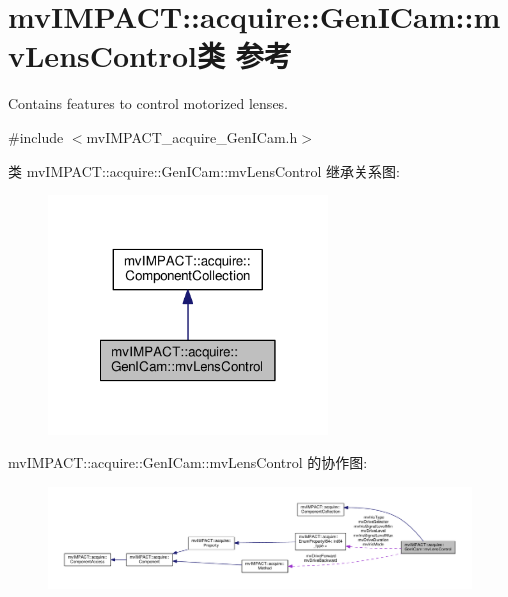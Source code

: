 \hypertarget{classmv_i_m_p_a_c_t_1_1acquire_1_1_gen_i_cam_1_1mv_lens_control}{\section{mv\+I\+M\+P\+A\+C\+T\+:\+:acquire\+:\+:Gen\+I\+Cam\+:\+:mv\+Lens\+Control类 参考}
\label{classmv_i_m_p_a_c_t_1_1acquire_1_1_gen_i_cam_1_1mv_lens_control}
}


Contains features to control motorized lenses.  




{\ttfamily \#include $<$mv\+I\+M\+P\+A\+C\+T\+\_\+acquire\+\_\+\+Gen\+I\+Cam.\+h$>$}



类 mv\+I\+M\+P\+A\+C\+T\+:\+:acquire\+:\+:Gen\+I\+Cam\+:\+:mv\+Lens\+Control 继承关系图\+:
\nopagebreak
\begin{figure}[H]
\begin{center}
\leavevmode
\includegraphics[width=210pt]{classmv_i_m_p_a_c_t_1_1acquire_1_1_gen_i_cam_1_1mv_lens_control__inherit__graph}
\end{center}
\end{figure}


mv\+I\+M\+P\+A\+C\+T\+:\+:acquire\+:\+:Gen\+I\+Cam\+:\+:mv\+Lens\+Control 的协作图\+:
\nopagebreak
\begin{figure}[H]
\begin{center}
\leavevmode
\includegraphics[width=350pt]{classmv_i_m_p_a_c_t_1_1acquire_1_1_gen_i_cam_1_1mv_lens_control__coll__graph}
\end{center}
\end{figure}
